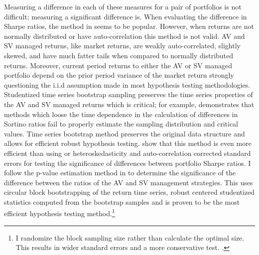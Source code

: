 Measuring a difference in each of these measures for a pair of portfolios is not difficult; measuring a significant difference is.  When evaluating the difference in Sharpe ratios, the method in \citet{memmel_performance_2003} seems to be popular. However, when returns are not normally distributed or have auto-correlation this method is not valid. AV and SV managed returns, like market returns, are weakly auto-correlated, slightly skewed, and have much fatter tails when compared to normally distributed returns. Moreover, current period returns to either the AV or SV managed portfolio depend on the prior period variance of the market return strongly questioning the i.i.d assumption made in most hypothesis testing methodologies. Studentized time series bootstrap sampling preserves the time series properties of the AV and SV managed returns which is critical; for example, \citet{scherer_alternative_2004} demonstrates that methods which loose the time dependence in the calculation of differences in Sortino ratios fail to properly estimate the sampling distribution and critical values. Time series bootstrap method preserves the original data structure and allows for efficient robust hypothesis testing. \citep{politis_stationary_1994,davison1997bootstrap} \citet{ledoit_robust_2008} show that this method is even more efficient than using \citet{newey_simple_1987} or \citet{andrews_improved_1992} heteroskedasticity and auto-correlation corrected standard errors for testing the significance of differences between portfolio Sharpe ratios. I follow the p-value estimation method in \citet{ledoit_robust_2008} to determine the significance of the difference between the ratios of the AV and SV management strategies. This uses circular block bootstrapping of the return time series, robust centered studentized statistics computed from the bootstrap samples and is proven to be the most efficient hypothesis testing method.\footnote{I randomize the block sampling size rather than calculate the optimal size. This results in wider standard errors and a more conservative test. \citet{lahiri_theoretical_1999}.} \citep{politis_general_1992,ledoit_robust_2008}

